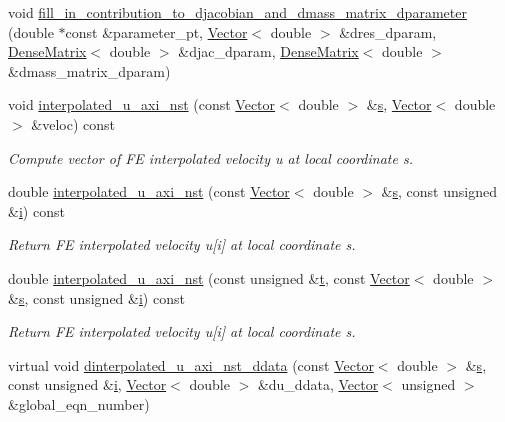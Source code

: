 \begin{DoxyCompactItemize}
void \hyperlink{classoomph_1_1AxisymmetricNavierStokesEquations_aa52f3f082e2dc8b2c0bc99215dc3ce02}{fill\+\_\+in\+\_\+contribution\+\_\+to\+\_\+djacobian\+\_\+and\+\_\+dmass\+\_\+matrix\+\_\+dparameter} (double $\ast$const \&parameter\+\_\+pt, \hyperlink{classoomph_1_1Vector}{Vector}$<$ double $>$ \&dres\+\_\+dparam, \hyperlink{classoomph_1_1DenseMatrix}{Dense\+Matrix}$<$ double $>$ \&djac\+\_\+dparam, \hyperlink{classoomph_1_1DenseMatrix}{Dense\+Matrix}$<$ double $>$ \&dmass\+\_\+matrix\+\_\+dparam)
\item 
void \hyperlink{classoomph_1_1AxisymmetricNavierStokesEquations_a6be05bce8f257044e1bb6929aa5e791e}{interpolated\+\_\+u\+\_\+axi\+\_\+nst} (const \hyperlink{classoomph_1_1Vector}{Vector}$<$ double $>$ \&\hyperlink{cfortran_8h_ab7123126e4885ef647dd9c6e3807a21c}{s}, \hyperlink{classoomph_1_1Vector}{Vector}$<$ double $>$ \&veloc) const
\begin{DoxyCompactList}\small\item\em Compute vector of FE interpolated velocity u at local coordinate s. \end{DoxyCompactList}\item 
double \hyperlink{classoomph_1_1AxisymmetricNavierStokesEquations_a3b2a46a33adcb2ceae75c3419ac86b19}{interpolated\+\_\+u\+\_\+axi\+\_\+nst} (const \hyperlink{classoomph_1_1Vector}{Vector}$<$ double $>$ \&\hyperlink{cfortran_8h_ab7123126e4885ef647dd9c6e3807a21c}{s}, const unsigned \&\hyperlink{cfortran_8h_adb50e893b86b3e55e751a42eab3cba82}{i}) const
\begin{DoxyCompactList}\small\item\em Return FE interpolated velocity u\mbox{[}i\mbox{]} at local coordinate s. \end{DoxyCompactList}\item 
double \hyperlink{classoomph_1_1AxisymmetricNavierStokesEquations_a48cccf419d71149e07ece0010490d4aa}{interpolated\+\_\+u\+\_\+axi\+\_\+nst} (const unsigned \&\hyperlink{cfortran_8h_af6f0bd3dc13317f895c91323c25c2b8f}{t}, const \hyperlink{classoomph_1_1Vector}{Vector}$<$ double $>$ \&\hyperlink{cfortran_8h_ab7123126e4885ef647dd9c6e3807a21c}{s}, const unsigned \&\hyperlink{cfortran_8h_adb50e893b86b3e55e751a42eab3cba82}{i}) const
\begin{DoxyCompactList}\small\item\em Return FE interpolated velocity u\mbox{[}i\mbox{]} at local coordinate s. \end{DoxyCompactList}\item 
virtual void \hyperlink{classoomph_1_1AxisymmetricNavierStokesEquations_ac2104aa72b43d60bb3fd20d63eab7844}{dinterpolated\+\_\+u\+\_\+axi\+\_\+nst\+\_\+ddata} (const \hyperlink{classoomph_1_1Vector}{Vector}$<$ double $>$ \&\hyperlink{cfortran_8h_ab7123126e4885ef647dd9c6e3807a21c}{s}, const unsigned \&\hyperlink{cfortran_8h_adb50e893b86b3e55e751a42eab3cba82}{i}, \hyperlink{classoomph_1_1Vector}{Vector}$<$ double $>$ \&du\+\_\+ddata, \hyperlink{classoomph_1_1Vector}{Vector}$<$ unsigned $>$ \&global\+\_\+eqn\+\_\+number)

\end{DoxyCompactItemize}
